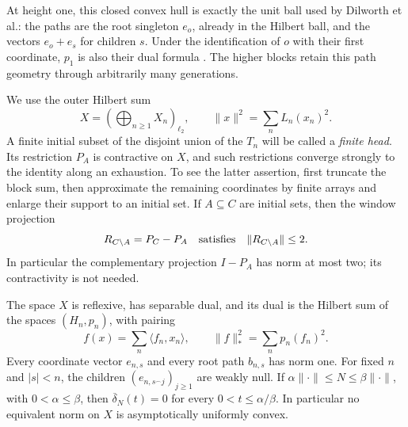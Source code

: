 At height one, this closed convex hull is exactly the unit ball used by
Dilworth et al.: the paths are the root singleton $e_o$, already in the
Hilbert ball, and the vectors $e_o+e_s$ for children $s$. Under the
identification of $o$ with their first coordinate, $p_1$ is also their
dual formula \cite[Lemma~2.5]{DKRRZ2016}. The higher blocks retain this
path geometry through arbitrarily many generations.

We use the outer Hilbert sum
\begin{equation}
 X=\left(\bigoplus_{n\ge1}X_n\right)_{\ell_2},
 \qquad \|x\|^2=\sum_nL_n(x_n)^2.
 \label{eq:linear-outer-sum}
\end{equation}
A finite initial subset of the disjoint union of the $T_n$ will be
called a \emph{finite head}.  Its restriction $P_A$ is contractive on
$X$, and such restrictions converge strongly to the identity along an
exhaustion.  To see the latter assertion, first truncate the block sum,
then approximate the remaining coordinates by finite arrays and enlarge
their support to an initial set.  If $A\subseteq C$ are initial sets,
then the window projection
\[
 R_{C\setminus A}=P_C-P_A
 \quad\hbox{satisfies}\quad \|R_{C\setminus A}\|\le2.
\]
In particular the complementary projection $I-P_A$ has norm at most
two; its contractivity is not needed.

\begin{proposition}
\label{prop:linear-geometry}
The space $X$ is reflexive, has separable dual, and its dual is the
Hilbert sum of the spaces $(H_n,p_n)$, with pairing
\[
 f(x)=\sum_n\langle f_n,x_n\rangle,
 \qquad \|f\|_*^2=\sum_np_n(f_n)^2.
\]
Every coordinate vector $e_{n,s}$ and every root path $b_{n,s}$ has norm
one.  For fixed $n$ and $|s|<n$, the children
$(e_{n,s^\frown j})_{j\ge1}$ are weakly null.
If $\alpha\|\cdot\|\le N\le\beta\|\cdot\|$, with
$0<\alpha\le\beta$, then $\overline\delta_N(t)=0$ for every
$0<t\le\alpha/\beta$.  In particular no equivalent norm on $X$
is asymptotically uniformly convex.
\end{proposition}

